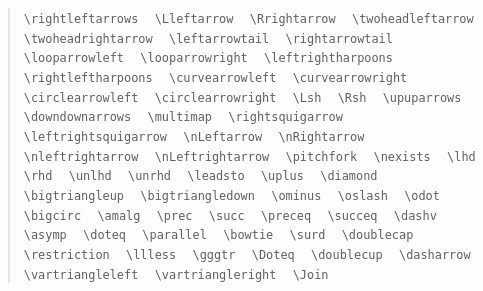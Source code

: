 \documentclass{article}
\newcommand{\texcommand}[1]{\textbackslash{}#1}
\newcommand{\spacer}{\,\,\, \hfil}
\newcommand{\lastspacer}{\hfill\hfill\hfill}
\newenvironment{mylist}{\begin{quote}}{\end{quote}}
\begin{document}
\begin{mylist}
\texttt{\texcommand{rightleftarrows}} \spacer 
\texttt{\texcommand{Lleftarrow}} \spacer 
\texttt{\texcommand{Rrightarrow}} \spacer 
\texttt{\texcommand{twoheadleftarrow}} \spacer 
\texttt{\texcommand{twoheadrightarrow}} \spacer 
\texttt{\texcommand{leftarrowtail}} \spacer 
\texttt{\texcommand{rightarrowtail}} \spacer 
\texttt{\texcommand{looparrowleft}} \spacer 
\texttt{\texcommand{looparrowright}} \spacer 
\texttt{\texcommand{leftrightharpoons}} \spacer 
\texttt{\texcommand{rightleftharpoons}} \spacer 
\texttt{\texcommand{curvearrowleft}} \spacer 
\texttt{\texcommand{curvearrowright}} \spacer 
\texttt{\texcommand{circlearrowleft}} \spacer 
\texttt{\texcommand{circlearrowright}} \spacer 
\texttt{\texcommand{Lsh}} \spacer 
\texttt{\texcommand{Rsh}} \spacer 
\texttt{\texcommand{upuparrows}} \spacer 
\texttt{\texcommand{downdownarrows}} \spacer 
\texttt{\texcommand{multimap}} \spacer 
\texttt{\texcommand{rightsquigarrow}} \spacer 
\texttt{\texcommand{leftrightsquigarrow}} \spacer 
\texttt{\texcommand{nLeftarrow}} \spacer 
\texttt{\texcommand{nRightarrow}} \spacer 
\texttt{\texcommand{nleftrightarrow}} \spacer 
\texttt{\texcommand{nLeftrightarrow}} \spacer 
\texttt{\texcommand{pitchfork}} \spacer 
\texttt{\texcommand{nexists}} \spacer 
\texttt{\texcommand{lhd}} \spacer 
\texttt{\texcommand{rhd}} \spacer 
\texttt{\texcommand{unlhd}} \spacer 
\texttt{\texcommand{unrhd}} \spacer 
\texttt{\texcommand{leadsto}} \spacer 
\texttt{\texcommand{uplus}} \spacer 
\texttt{\texcommand{diamond}} \spacer 
\texttt{\texcommand{bigtriangleup}} \spacer 
\texttt{\texcommand{bigtriangledown}} \spacer 
\texttt{\texcommand{ominus}} \spacer 
\texttt{\texcommand{oslash}} \spacer 
\texttt{\texcommand{odot}} \spacer 
\texttt{\texcommand{bigcirc}} \spacer 
\texttt{\texcommand{amalg}} \spacer 
\texttt{\texcommand{prec}} \spacer 
\texttt{\texcommand{succ}} \spacer 
\texttt{\texcommand{preceq}} \spacer 
\texttt{\texcommand{succeq}} \spacer 
\texttt{\texcommand{dashv}} \spacer 
\texttt{\texcommand{asymp}} \spacer 
\texttt{\texcommand{doteq}} \spacer 
\texttt{\texcommand{parallel}} \spacer 
\texttt{\texcommand{bowtie}} \spacer 
\texttt{\texcommand{surd}} \spacer 
\texttt{\texcommand{doublecap}} \spacer 
\texttt{\texcommand{restriction}} \spacer 
\texttt{\texcommand{llless}} \spacer 
\texttt{\texcommand{gggtr}} \spacer 
\texttt{\texcommand{Doteq}} \spacer 
\texttt{\texcommand{doublecup}} \spacer 
\texttt{\texcommand{dasharrow}} \spacer 
\texttt{\texcommand{vartriangleleft}} \spacer 
\texttt{\texcommand{vartriangleright}} \spacer 
\texttt{\texcommand{Join}} \lastspacer
\end{mylist}
\end{document}
